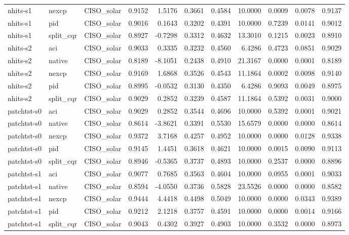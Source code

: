 \begin{tabular}{lllrrrrrrrr}
nhits-s1 & nexcp & CISO_solar & 0.9152 & 1.5176 & 0.3661 & 0.4584 & 10.0000 & 0.0009 & 0.0078 & 0.9137 \\
nhits-s1 & pid & CISO_solar & 0.9016 & 0.1643 & 0.3202 & 0.4391 & 10.0000 & 0.7239 & 0.0141 & 0.9012 \\
nhits-s1 & split_cqr & CISO_solar & 0.8927 & -0.7298 & 0.3312 & 0.4632 & 13.3010 & 0.1215 & 0.0023 & 0.8910 \\
nhits-s2 & aci & CISO_solar & 0.9033 & 0.3335 & 0.3232 & 0.4560 & 6.4286 & 0.4723 & 0.0851 & 0.9029 \\
nhits-s2 & native & CISO_solar & 0.8189 & -8.1051 & 0.2438 & 0.4910 & 21.3167 & 0.0000 & 0.0001 & 0.8189 \\
nhits-s2 & nexcp & CISO_solar & 0.9169 & 1.6868 & 0.3526 & 0.4543 & 11.1864 & 0.0002 & 0.0098 & 0.9140 \\
nhits-s2 & pid & CISO_solar & 0.8995 & -0.0532 & 0.3130 & 0.4350 & 6.4286 & 0.9093 & 0.0049 & 0.8975 \\
nhits-s2 & split_cqr & CISO_solar & 0.9029 & 0.2852 & 0.3239 & 0.4587 & 11.1864 & 0.5392 & 0.0031 & 0.9000 \\
patchtst-s0 & aci & CISO_solar & 0.9029 & 0.2852 & 0.3544 & 0.4696 & 10.0000 & 0.5392 & 0.0001 & 0.9021 \\
patchtst-s0 & native & CISO_solar & 0.8614 & -3.8621 & 0.3391 & 0.5530 & 15.6579 & 0.0000 & 0.0000 & 0.8614 \\
patchtst-s0 & nexcp & CISO_solar & 0.9372 & 3.7168 & 0.4257 & 0.4952 & 10.0000 & 0.0000 & 0.0128 & 0.9338 \\
patchtst-s0 & pid & CISO_solar & 0.9145 & 1.4451 & 0.3618 & 0.4621 & 10.0000 & 0.0015 & 0.0090 & 0.9113 \\
patchtst-s0 & split_cqr & CISO_solar & 0.8946 & -0.5365 & 0.3737 & 0.4893 & 10.0000 & 0.2537 & 0.0000 & 0.8896 \\
patchtst-s1 & aci & CISO_solar & 0.9077 & 0.7685 & 0.3563 & 0.4604 & 10.0000 & 0.0955 & 0.0001 & 0.9033 \\
patchtst-s1 & native & CISO_solar & 0.8594 & -4.0550 & 0.3736 & 0.5828 & 23.5526 & 0.0000 & 0.0000 & 0.8582 \\
patchtst-s1 & nexcp & CISO_solar & 0.9444 & 4.4418 & 0.4498 & 0.5049 & 10.0000 & 0.0000 & 0.0343 & 0.9389 \\
patchtst-s1 & pid & CISO_solar & 0.9212 & 2.1218 & 0.3757 & 0.4591 & 10.0000 & 0.0000 & 0.0014 & 0.9166 \\
patchtst-s1 & split_cqr & CISO_solar & 0.9043 & 0.4302 & 0.3927 & 0.4903 & 10.0000 & 0.3532 & 0.0000 & 0.8973 \\

\end{tabular}
